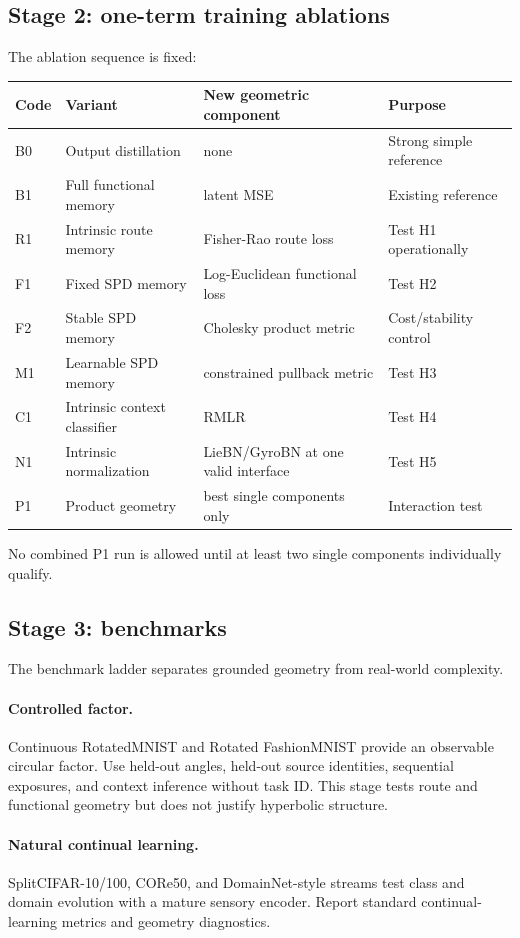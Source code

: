 \subsection{Stage 2: one-term training ablations}
The ablation sequence is fixed:
\begin{center}
\begin{tabularx}{\textwidth}{@{}lXll@{}}
\toprule
Code & Variant & New geometric component & Purpose \\
\midrule
B0 & Output distillation & none & Strong simple reference \\
B1 & Full functional memory & latent MSE & Existing \MMALS{} reference \\
R1 & Intrinsic route memory & Fisher-Rao route loss & Test H1 operationally \\
F1 & Fixed SPD memory & Log-Euclidean functional loss & Test H2 \\
F2 & Stable SPD memory & Cholesky product metric & Cost/stability control \\
M1 & Learnable SPD memory & constrained pullback metric & Test H3 \\
C1 & Intrinsic context classifier & RMLR & Test H4 \\
N1 & Intrinsic normalization & LieBN/GyroBN at one valid interface & Test H5 \\
P1 & Product geometry & best single components only & Interaction test \\
\bottomrule
\end{tabularx}
\end{center}
No combined P1 run is allowed until at least two single components individually qualify.

\subsection{Stage 3: benchmarks}
The benchmark ladder separates grounded geometry from real-world complexity.

\paragraph{Controlled factor.}
Continuous RotatedMNIST and Rotated FashionMNIST provide an observable circular factor. Use held-out angles, held-out source identities, sequential exposures, and context inference without task ID. This stage tests route and functional geometry but does not justify hyperbolic structure.

\paragraph{Natural continual learning.}
SplitCIFAR-10/100, CORe50, and DomainNet-style streams test class and domain evolution with a mature sensory encoder. Report standard continual-learning metrics and geometry diagnostics.

